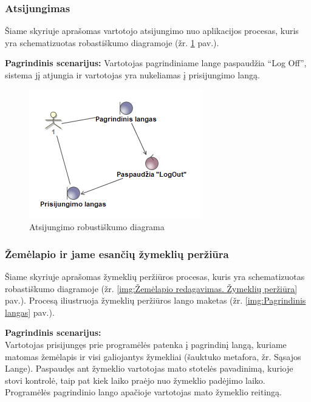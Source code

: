 \documentclass{VUMIFPSkursinis}
\begin{document}
\subsubsection{Atsijungimas}
	Šiame skyriuje aprašomas vartotojo atsijungimo nuo aplikacijos procesas, kuris yra schematizuotas robastiškumo diagramoje (žr. \ref{img:Atsijungimo robustiškumo diagrama} pav.).
	
	\textbf{Pagrindinis scenarijus:}
	Vartotojas pagrindiniame lange paspaudžia “Log Off”, sistema jį atjungia ir vartotojas yra nukeliamas į prisijungimo langą.
		\begin{figure}[H]
				\centering
				\includegraphics[scale=1]{img/Robustness_Atsijungimas}
				\caption{Atsijungimo robustiškumo diagrama}
				\label{img:Atsijungimo robustiškumo diagrama}
			\end{figure}

\subsubsection{Žemėlapio ir jame esančių žymeklių peržiūra}
	Šiame skyriuje aprašomas žymeklių peržiūros procesas, kuris yra schematizuotas robastiškumo diagramoje (žr. \ref{img:Žemėlapio redagavimas. Žymeklių peržiūra} pav.). 
	Procesą iliustruoja žymeklių peržiūros lango maketas (žr. \ref{img:Pagrindinis langas} pav.).

	\textbf{Pagrindinis scenarijus:}\\
	Vartotojas prisijungęs prie programėlės patenka į pagrindinį langą, kuriame matomas žemėlapis ir visi galiojantys žymekliai (šauktuko metafora, žr. Sąsajos Lange). Paspaudęs ant žymeklio vartotojas mato stotelės pavadinimą, kurioje stovi kontrolė, taip pat kiek laiko praėjo nuo žymeklio padėjimo laiko. Programėlės pagrindinio lango apačioje vartotojas mato žymeklio reitingą.
	
\end{document}
